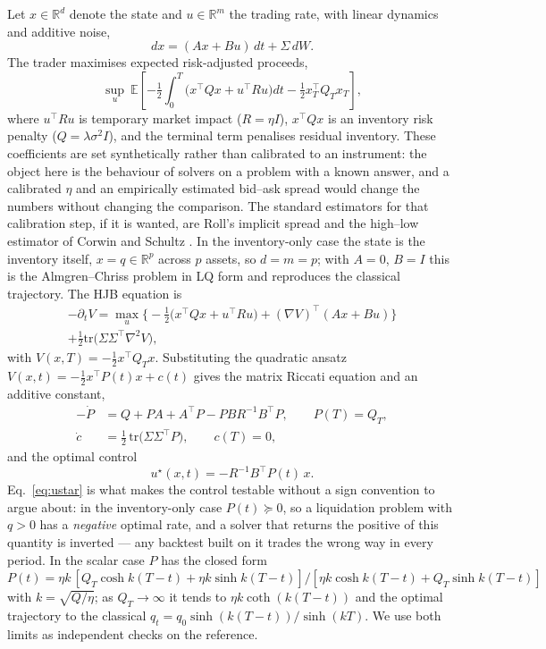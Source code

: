 \documentclass[conference]{IEEEtran}
\begin{document}
Let $x \in \mathbb{R}^d$ denote the state and $u \in \mathbb{R}^m$ the trading rate, with linear
dynamics and additive noise,
\begin{equation}
dx = (Ax + Bu)\,dt + \Sigma\,dW .
\end{equation}
The trader maximises expected risk-adjusted proceeds,
\begin{equation}
\sup_{u}\ \mathbb{E}\!\left[
-\tfrac{1}{2}\!\int_0^T\!\!\big(x^\top Q x + u^\top R u\big)dt
-\tfrac{1}{2}x_T^\top Q_T x_T
\right],
\end{equation}
where $u^\top R u$ is temporary market impact ($R = \eta I$), $x^\top Q x$ is an inventory risk
penalty ($Q = \lambda\sigma^2 I$), and the terminal term penalises residual inventory. These
coefficients are set synthetically rather than calibrated to an instrument: the object here is the
behaviour of solvers on a problem with a known answer, and a calibrated $\eta$ and an empirically
estimated bid--ask spread would change the numbers without changing the comparison. The standard
estimators for that calibration step, if it is wanted, are Roll's implicit spread
\cite{roll1984simple} and the high--low estimator of Corwin and Schultz \cite{corwin2012simple}. In
the inventory-only case the state is the inventory itself, $x = q \in \mathbb{R}^p$ across $p$
assets, so $d = m = p$; with $A = 0$, $B = I$ this is the Almgren--Chriss problem in LQ form and
reproduces the classical trajectory. The HJB equation is
\begin{equation}
\begin{split}
-\partial_t V = \max_u\Big\{-\tfrac{1}{2}\big(x^\top Qx + u^\top Ru\big)
+ (\nabla V)^\top(Ax + Bu)\Big\} \\
+ \tfrac{1}{2}\mathrm{tr}\big(\Sigma\Sigma^\top \nabla^2 V\big),
\end{split}
\end{equation}
with $V(x,T) = -\tfrac{1}{2}x^\top Q_T x$. Substituting the quadratic ansatz
$V(x,t) = -\tfrac{1}{2}x^\top P(t)x + c(t)$ gives the matrix Riccati equation and an additive
constant,
\begin{align}
-\dot P &= Q + PA + A^\top P - PBR^{-1}B^\top P, \qquad P(T) = Q_T, \\
\dot c &= \tfrac{1}{2}\,\mathrm{tr}\big(\Sigma\Sigma^\top P\big), \qquad c(T) = 0,
\end{align}
and the optimal control
\begin{equation}\label{eq:ustar}
u^\star(x,t) = -R^{-1}B^\top P(t)\,x .
\end{equation}
Eq.~\eqref{eq:ustar} is what makes the control testable without a sign convention to argue about: in
the inventory-only case $P(t) \succeq 0$, so a liquidation problem with $q > 0$ has a \emph{negative}
optimal rate, and a solver that returns the positive of this quantity is inverted --- any backtest
built on it trades the wrong way in every period. In the scalar case $P$ has the closed form
$P(t) = \eta k\,[Q_T\cosh k(T{-}t) + \eta k\sinh k(T{-}t)] / [\eta k\cosh k(T{-}t) +
Q_T\sinh k(T{-}t)]$ with $k=\sqrt{Q/\eta}$; as $Q_T \to \infty$ it tends to
$\eta k\coth(k(T-t))$ and the optimal trajectory to the classical
$q_t = q_0\sinh(k(T-t))/\sinh(kT)$. We use both limits as independent checks on the reference.
\end{document}
